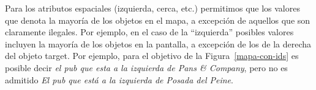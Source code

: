Para los atributos espaciales (izquierda, cerca, etc.) permitimos que los valores que denota la mayor\'{i}a de los objetos en el mapa, a excepci\'on de aquellos que son claramente ilegales. Por ejemplo, en el caso de la ``izquierda'' posibles valores incluyen la mayor\'{i}a de los objetos en la pantalla, a excepci\'on de los de la derecha del objeto target. Por ejemplo, para el objetivo de la Figura~\ref{mapa-con-ids} es posible decir {\it el pub que esta a la izquierda de Pans \& Company}, pero no es admitido {\it El pub que est\'a a la izquierda de Posada del Peine}.
%






